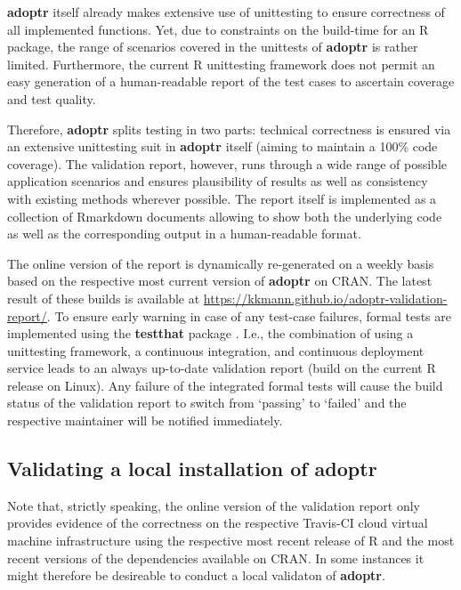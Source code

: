 \documentclass[
]{book}
\begin{document}
\textbf{adoptr} itself already makes extensive use of unittesting to
ensure correctness of all implemented functions.
Yet, due to constraints on the build-time for an R package,
the range of scenarios covered in the unittests of \textbf{adoptr} is
rather limited.
Furthermore, the current R unittesting framework does not permit
an easy generation of a human-readable report of the test cases
to ascertain coverage and test quality.

Therefore, \textbf{adoptr} splits testing in two parts: technical
correctness is ensured via an extensive unittesting suit in \textbf{adoptr}
itself (aiming to maintain a 100\% code coverage).
The validation report, however, runs through a wide range of possible
application scenarios and ensures plausibility of results as well
as consistency with existing methods wherever possible.
The report itself is implemented as a collection of Rmarkdown documents
allowing to show both the underlying code as well as the corresponding
output in a human-readable format.

The online version of the report is dynamically re-generated on a
weekly basis based on the respective
most current version of \textbf{adoptr} on CRAN.
The latest result of these builds is available at
\url{https://kkmann.github.io/adoptr-validation-report/}.
To ensure early warning in case of any test-case failures,
formal tests are implemented using the \textbf{testthat} package
\citep{R-testthat}.
I.e., the combination of using a unittesting framework, a continuous
integration, and continuous deployment service leads to an always
up-to-date validation report (build on the current R release on Linux).
Any failure of the integrated formal tests will cause the build status
of the validation report to switch from `passing' to `failed' and
the respective maintainer will be notified immediately.

\hypertarget{validating-a-local-installation-of-adoptr}{%
\subsection{Validating a local installation of adoptr}\label{validating-a-local-installation-of-adoptr}}

Note that, strictly speaking, the online version of the validation
report only provides evidence of the correctness on the respective
Travis-CI cloud virtual machine infrastructure using the respective
most recent release of R and the most recent versions of the
dependencies available on CRAN.
In some instances it might therefore be desireable to conduct a
local validaton of \textbf{adoptr}.
\end{document}
